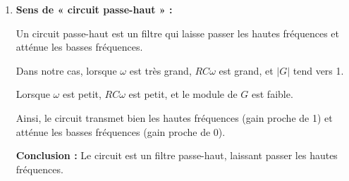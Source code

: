 \documentclass[a4paper,12pt]{article}
\begin{document}
\begin{solutionbox}
\begin{enumerate}
    Alors :

    \[
    G = \dfrac{i \times 3840}{1 + i \times 3840} = \dfrac{i \times 3840}{1 + i \times 3840}
    \]

    Calculons le module de \( G \) :

    Le module de \( G \) est :

    \[
    |G| = \dfrac{|i \times 3840|}{\sqrt{1^2 + (3840)^2}} = \dfrac{3840}{\sqrt{1 + 3840^2}}
    \]

    Calculons \( \sqrt{1 + 3840^2} \) :

    \[
    \sqrt{1 + 3840^2} = \sqrt{1 + 14,745,600} = \sqrt{14,745,601} \approx 3840.00013
    \]

    Donc :

    \[
    |G| = \dfrac{3840}{3840.00013} \approx 0.99999997 \approx 1
    \]

    \textbf{Conclusion :} Le module de \( G \) est très proche de 1.

    \item \textbf{Sens de « circuit passe-haut » :}

    Un circuit passe-haut est un filtre qui laisse passer les hautes fréquences et atténue les basses fréquences.

    Dans notre cas, lorsque \( \omega \) est très grand, \( R C \omega \) est grand, et \( |G| \) tend vers 1.

    Lorsque \( \omega \) est petit, \( R C \omega \) est petit, et le module de \( G \) est faible.

    Ainsi, le circuit transmet bien les hautes fréquences (gain proche de 1) et atténue les basses fréquences (gain proche de 0).

    \textbf{Conclusion :} Le circuit est un filtre passe-haut, laissant passer les hautes fréquences.

\end{enumerate}
\end{solutionbox}
\end{document}
